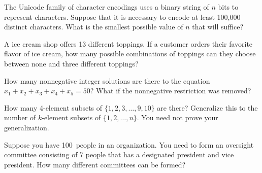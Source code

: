\documentclass[11pt,letterpaper]{article}
\begin{document}
\homework{}

 The Unicode family of character encodings uses a binary string of $n$ bits to represent characters. Suppose that it is necessary to encode at least 100,000 distinct characters. What is the smallest possible value of $n$ that will suffice? 





\newpage





 A ice cream shop offers 13 different toppings. If a customer orders their favorite flavor of ice cream, how many possible combinations of toppings can they choose between none and three different toppings? \pspace





\newpage





 How many nonnegative integer solutions are there to the equation $x_1 + x_2 + x_3 + x_4 + x_5= 50$? What if the nonnegative restriction was removed? \pspace





\newpage





 How many 4-element subsets of $\{ 1, 2, 3, \ldots, 9, 10 \}$ are there? Generalize this to the number of $k$-element subsets of $\{ 1, 2, \ldots, n \}$. You need not prove your generalization. \pspace





\newpage





 Suppose you have 100~people in an organization. You need to form an oversight committee consisting of 7 people that has a designated president and vice president. How many different committees can be formed? \pspace 
\end{document}
